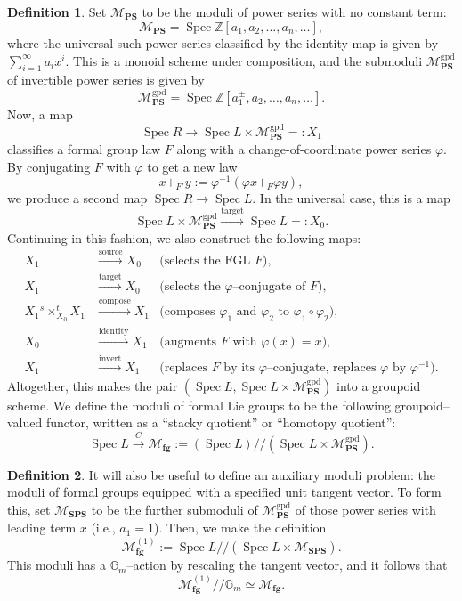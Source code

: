 \documentclass{amsart}
\newcommand{\Z}{\mathbb Z}
\newcommand{\<}{\langle}
\renewcommand{\>}{\rangle}
\renewcommand{\phi}{\varphi}
\newcommand{\mmod}{/\!\!/}
\newcommand{\moduli}[1]{\mathcal{M}_{\mathbf{#1}}}
\newcommand{\gpd}{\mathrm{gpd}}
\DeclareMathOperator{\Spec}{Spec}
\theoremstyle{plain}
\theoremstyle{definition}
\newtheorem*{definition}{Definition}
\theoremstyle{remark}
\begin{document}
\begin{definition}
Set $\moduli{PS}$ to be the moduli of power series with no constant term: \[\moduli{PS} = \Spec \Z[a_1, a_2, \ldots, a_n, \ldots],\] where the universal such power series classified by the identity map is given by $\sum_{i=1}^\infty a_i x^i$.  This is a monoid scheme under composition, and the submoduli $\moduli{PS}^{\gpd}$ of invertible power series is given by \[\moduli{PS}^{\gpd} = \Spec \Z[a_1^\pm, a_2, \ldots, a_n, \ldots].\]  Now, a map \[\Spec R \to \Spec L \times \moduli{PS}^{\gpd} =: X_1\] classifies a formal group law $F$ along with a change-of-coordinate power series $\phi$.  By conjugating $F$ with $\phi$ to get a new law \[x +_{F'} y := \phi^{-1}(\phi x +_F \phi y),\] we produce a second map $\Spec R \to \Spec L$.  In the universal case, this is a map \[\Spec L \times \moduli{PS}^{\gpd} \xrightarrow{\text{target}} \Spec L =: X_0.\]  Continuing in this fashion, we also construct the following maps:
\begin{align*}
X_1 & \xrightarrow{\text{source}} X_0 & \text{(selects the FGL $F$)}, \\
X_1 & \xrightarrow{\text{target}} X_0 & \text{(selects the $\phi$--conjugate of $F$)}, \\
X_1 {{}^s \times_{X_0}^t} X_1 & \xrightarrow{\text{compose}} X_1 & \text{(composes $\phi_1$ and $\phi_2$ to $\phi_1 \circ \phi_2$)}, \\
X_0 & \xrightarrow{\text{identity}} X_1 & \text{(augments $F$ with $\phi(x) = x$)}, \\
X_1 & \xrightarrow{\text{invert}} X_1 & \text{(replaces $F$ by its $\phi$--conjugate, replaces $\phi$ by $\phi^{-1}$)}.
\end{align*}
Altogether, this makes the pair $(\Spec L, \Spec L \times \moduli{PS}^{\gpd})$ into a groupoid scheme.  We define the moduli of formal Lie groups to be the following groupoid--valued functor, written as a ``stacky quotient'' or ``homotopy quotient'': \[\Spec L \xrightarrow{C} \moduli{fg} := (\Spec L) \mmod (\Spec L \times \moduli{PS}^{\gpd}).\]
\end{definition}

\begin{definition}\label{StrictModuliOfFGs}
It will also be useful to define an auxiliary moduli problem: the moduli of formal groups equipped with a specified unit tangent vector.  To form this, set $\moduli{SPS}$ to be the further submoduli of $\moduli{PS}^{\gpd}$ of those power series with leading term $x$ (i.e., $a_1 = 1$).  Then, we make the definition \[\moduli{fg}^{(1)} := \Spec L \mmod (\Spec L \times \moduli{SPS}).\]  This moduli has a $\mathbb G_m$--action by rescaling the tangent vector, and it follows that \[\moduli{fg}^{(1)} \mmod \mathbb G_m \simeq \moduli{fg}.\]
\end{definition}
\end{document}
